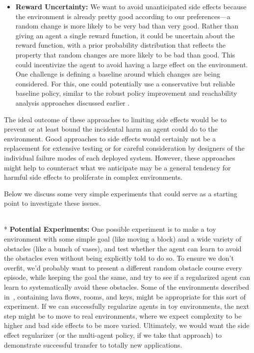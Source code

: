 \documentclass[a4paper,10pt]{article}
\begin{document}
\begin{itemize}
\item {\bf Reward Uncertainty:} We want to avoid unanticipated side effects because the environment is already pretty good according to our preferences—a random change is more likely to be very bad than very good. Rather than giving an agent a single reward function, it could be uncertain about the reward function, with a prior probability distribution that reflects the property that random changes are more likely to be bad than good. This could incentivize the agent to avoid having a large effect on the environment. One challenge is defining a baseline around which changes are being considered. For this, one could potentially use a conservative but reliable baseline policy, similar to the robust policy improvement and reachability analysis approaches discussed earlier \cite{lygeros1999controllers,mitchell2005time,iyengar2005robust,nilim2005robust}.
\end{itemize}

The ideal outcome of these approaches to limiting side effects would be to prevent or at least bound the incidental harm an agent could do to the environment.  Good approaches to side effects would certainly not be a replacement for extensive testing or for careful consideration by designers of the individual failure modes of each deployed system.  However, these approaches might help to counteract what we anticipate may be a general tendency for harmful side effects to proliferate in complex environments.

Below we discuss some very simple experiments that could serve as a starting point to investigate these issues.

$~$\\* {\bf Potential Experiments:} One possible experiment is to make a toy environment with some simple goal (like moving a block) and a wide variety of obstacles (like a bunch of vases), and test whether the agent can learn to avoid the obstacles even without being explicitly told to do so.  To ensure we don’t overfit, we’d probably want to present a different random obstacle course every episode, while keeping the goal the same, and try to see if a regularized agent can learn to systematically avoid these obstacles.  Some of the environments described in~\cite{mohamed2015variational}, containing lava flows, rooms, and keys, might be appropriate for this sort of experiment. If we can successfully regularize agents in toy environments, the next step might be to move to real environments, where we expect complexity to be higher and bad side effects to be more varied.  Ultimately, we would want the side effect regularizer (or the multi-agent policy, if we take that approach) to demonstrate successful transfer to totally new applications.
\end{document}
